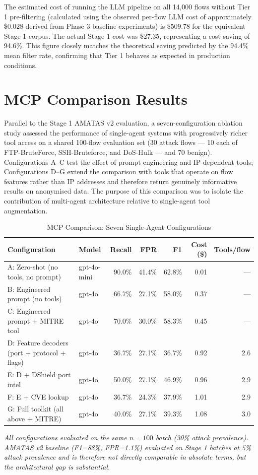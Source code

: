 \documentclass[../main.tex]{subfiles}
\begin{document}
The estimated cost of running the LLM pipeline on all 14,000 flows without Tier 1 pre-filtering (calculated using the observed per-flow LLM cost of approximately \$0.028 derived from Phase 3 baseline experiments) is \$509.78 for the equivalent Stage 1 corpus. The actual Stage 1 cost was \$27.35, representing a cost saving of 94.6\%. This figure closely matches the theoretical saving predicted by the 94.4\% mean filter rate, confirming that Tier 1 behaves as expected in production conditions.

\section{MCP Comparison Results}
\label{sec:mcp-comparison}

Parallel to the Stage 1 AMATAS v2 evaluation, a seven-configuration ablation study assessed the performance of single-agent systems with progressively richer tool access on a shared 100-flow evaluation set (30 attack flows --- 10 each of FTP-BruteForce, SSH-Bruteforce, and DoS-Hulk --- and 70 benign). Configurations A--C test the effect of prompt engineering and IP-dependent tools; Configurations D--G extend the comparison with tools that operate on flow features rather than IP addresses and therefore return genuinely informative results on anonymised data. The purpose of this comparison was to isolate the contribution of multi-agent architecture relative to single-agent tool augmentation.

\begin{table}[H]
\centering
\caption{MCP Comparison: Seven Single-Agent Configurations}
\label{tab:mcp-comparison}
\scriptsize
\begin{tabularx}{\textwidth}{@{}l l r r r r r@{}}
\toprule
Configuration & Model & Recall & FPR & F1 & Cost (\$) & Tools/flow \\
\midrule
A: Zero-shot (no tools, no prompt) & gpt-4o-mini & 90.0\% & 41.4\% & 62.8\% & 0.01 & --- \\
B: Engineered prompt (no tools) & gpt-4o & 66.7\% & 27.1\% & 58.0\% & 0.37 & --- \\
C: Engineered prompt + MITRE tool & gpt-4o & 70.0\% & 30.0\% & 58.3\% & 0.45 & --- \\
\addlinespace
D: Feature decoders (port + protocol + flags) & gpt-4o & 36.7\% & 27.1\% & 36.7\% & 0.92 & 2.6 \\
E: D + DShield port intel & gpt-4o & 50.0\% & 27.1\% & 46.9\% & 0.96 & 2.9 \\
F: E + CVE lookup & gpt-4o & 36.7\% & 24.3\% & 37.9\% & 1.01 & 2.9 \\
G: Full toolkit (all above + MITRE) & gpt-4o & 40.0\% & 27.1\% & 39.3\% & 1.08 & 3.0 \\
\bottomrule
\end{tabularx}

\vspace{0.5em}
\noindent\textit{All configurations evaluated on the same $n=100$ batch (30\% attack prevalence). AMATAS v2 baseline (F1=88\%, FPR=1.1\%) evaluated on Stage 1 batches at 5\% attack prevalence and is therefore not directly comparable in absolute terms, but the architectural gap is substantial.}
\end{table}
\end{document}
